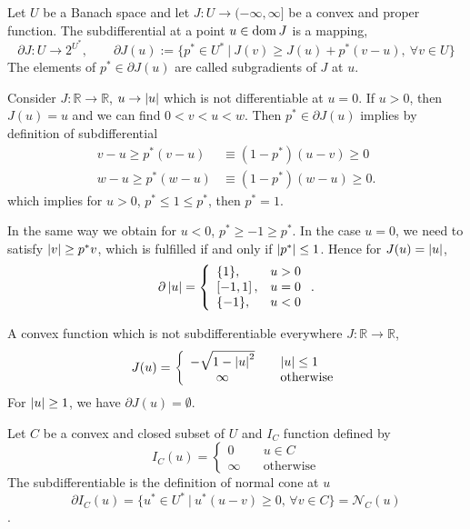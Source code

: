 \begin{definition}
	Let $U$ be a Banach space and let $J:U\rightarrow (-\infty, \infty]$ be a convex and proper function.
	The subdifferential at a point $u \in \mathrm{dom\,} J$ is a mapping,
	\[
		\partial J : U \rightarrow 2^{U^*}, \qquad \partial J(u):=\lbrace p^* \in U^* \ | \ J(v)\geq J(u)+p^*(v-u),
		\ \forall v \in U\rbrace
	\]
	The elements of $p^* \in \partial J(u)$ are called subgradients of $J$ at $u$.
\end{definition}
\begin{example}
	Consider $J:\mathbb{R}\rightarrow \mathbb{R}$, $u\rightarrow \left|u\right|$ which is not differentiable at $u=0$. If $u>0$, then $J(u)=u$ and we can find $0<v<u<w$. Then $p^* \in \partial J(u)$ implies by definition of subdifferential
	\begin{align*}
		v-u \geq p^*(v-u) &\equiv (1-p^*)(u-v) \geq 0 \\
		w-u \geq p^*(w-u) &\equiv (1-p^*)(w-u) \geq 0.
	\end{align*}
	which implies for $u>0$, $p^* \leq 1 \leq p^*$, then $p^*=1$.
	
	In the same way we obtain for $u<0$, $p^*\geq -1 \geq p^*$. 
	In the case $u=0$, we need to satisfy $\left|v\right|\geq p^*v$, which is fulfilled if and only if $\left|p^*\right|\leq 1$. Hence for $J(u)=\left|u\right|$,
	\begin{equation*}
	\partial \left|u\right|=
	\left\lbrace
		\begin{array}{lr}
		\{1\}, & u>0 \\
		\left[-1,1\right], & u=0 \\
		\{-1\}, & u < 0
		\end{array}
	\right. .
	\end{equation*}
\end{example}

\begin{example}
	A convex function which is not subdifferentiable everywhere $J:\mathbb{R} \rightarrow \mathbb{R}$, 
	\begin{equation*}
		J(u)=\left\lbrace\begin{array}{cl}
		 -\sqrt{1-\left|u\right|^2} &\quad \left|u\right|\leq 1 \\
		 \infty &\quad \text{otherwise}
		\end{array}
	\right.
	\end{equation*}
	For $\left|u\right|\geq 1$, we have $\partial J(u) = \emptyset$.
\end{example}

\begin{example}
	Let $C$ be a convex and closed subset of $U$ and $I_C$ function defined by
	\[
		I_C (u)=
		\left\lbrace
		\begin{array}{cl}
			0 \quad& u\in C \\
			\infty \quad& \text{otherwise}
		\end{array}
		\right.
	\]
	The subdifferentiable is the definition of normal cone at $u$
	\[\partial I_C (u)=\lbrace u^* \in U^* \ | \ u^*(u-v)\geq 0, \, \forall v \in C\rbrace = \mathcal{N}_C(u)\].

\end{example}


